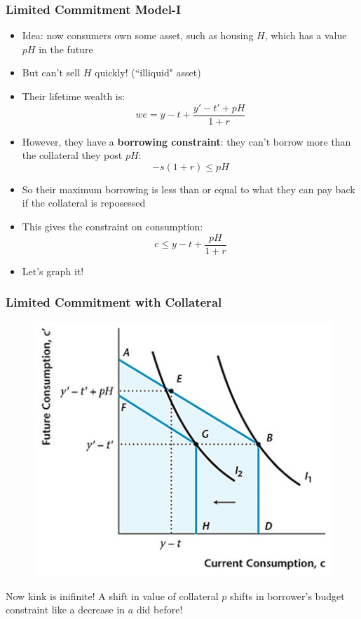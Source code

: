 \documentclass{beamer}
\begin{document}
\begin{frame}
\frametitle[alignment=center]{Limited Commitment Model-I}
\begin{itemize}
\item Idea:  now consumers own some asset, such as housing $H$, which has a value $pH$ in the future
\bigskip
\item But can't sell $H$ quickly!  (``illiquid" asset)
\bigskip
\item Their lifetime wealth is:
$$we=y-t+\frac{y'-t'+pH}{1+r}$$
\item However, they have a \textbf{borrowing constraint}: they can't borrow more than the collateral they post $pH$:
$$-s(1+r)\leq pH$$
\item So their maximum borrowing is less than or equal to what they can pay back if the collateral is reposessed
\bigskip
\item This gives the constraint on consumption:
$$c\leq y-t+\frac{pH}{1+r}$$
\item Let's graph it!
\end{itemize}
 \end{frame}

\begin{frame}
\frametitle[alignment=center]{Limited Commitment with Collateral}
\begin{figure}
\includegraphics[scale=0.5]{Figures/W_Fig_10pt5.png}
\end{figure}
Now kink is inifinite!  A shift in value of collateral $p$ shifts in borrower's budget constraint like a decrease in $a$ did before! 
 \end{frame}
\end{document}
